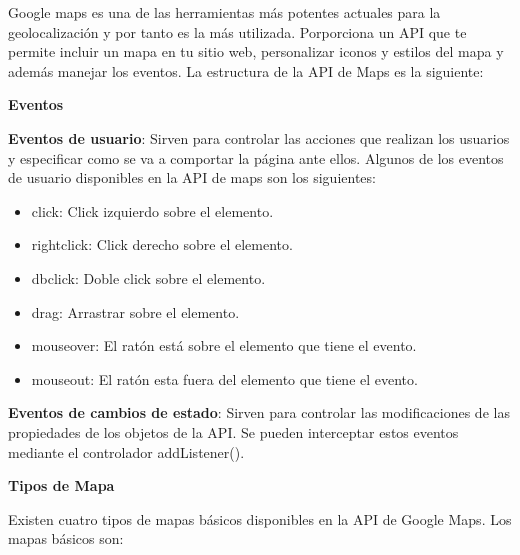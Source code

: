 \vspace{5 mm}

Google maps es una de las herramientas más potentes actuales para la geolocalización y por tanto es la más utilizada. Porporciona un API que te permite incluir un mapa en tu sitio web, personalizar iconos y estilos del mapa y además manejar los eventos. La estructura de la API de Maps es la siguiente:

\vspace{5 mm}

\textbf{Eventos}

\vspace{5 mm}

 \textbf{Eventos de usuario}: Sirven para controlar las acciones que realizan los usuarios y especificar como se va a comportar la página ante ellos. Algunos de los eventos de usuario disponibles en la API de maps son los siguientes:

\begin{itemize}

\item click: Click izquierdo sobre el elemento.

\item rightclick: Click derecho sobre el elemento.

\item dbclick: Doble click sobre el elemento.

\item drag: Arrastrar sobre el elemento.

\item mouseover: El ratón está sobre el elemento que tiene el evento.

\item mouseout: El ratón esta fuera del elemento que tiene el evento.

\end{itemize}

\textbf{Eventos de cambios de estado}: Sirven para controlar las modificaciones de las propiedades de los objetos de la API. Se pueden interceptar estos eventos mediante el controlador addListener().

\vspace{5 mm}

\textbf{Tipos de Mapa}

\vspace{5 mm}

Existen cuatro tipos de mapas básicos disponibles en la API de Google Maps. Los mapas básicos son:


